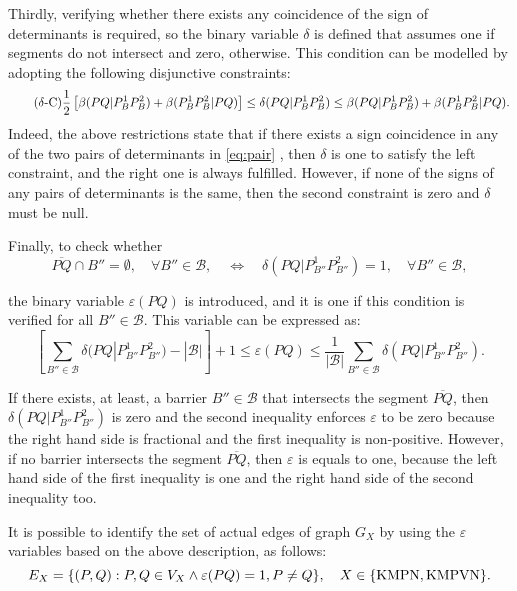 \documentclass[a4paper,  review, authoryear, 1p.]{elsarticle}
\newcommand{\B}{{\mathcal B}}
\newcommand{\segment}[2]{\overline{#1#2}}
\begin{document}
\bigskip

\newcommand{\deltacheck}[4]{\delta(#1#2|#3#4)}

Thirdly, verifying whether there exists any coincidence of the sign of determinants is required, so the binary variable $\delta$ is defined that assumes one if segments do not intersect and zero, otherwise. This condition can be modelled by adopting the following disjunctive constraints:
\begin{equation*}\tag{$\delta$-C}\label{eq:deltaC}
	\frac{1}{2}\left[\betamas{P}{Q}{P_B^1}{P_B^2}+\betamas{P_B^1}{P_B^2}{P}{Q}\right]\leq\deltacheck{P}{Q}{P_B^1}{P_B^2}\leq \betamas{P}{Q}{P_B^1}{P_B^2}+\betamas{P_B^1}{P_B^2}{P}{Q}.
\end{equation*}
Indeed, the above restrictions state that if there exists a sign coincidence in any of the two pairs of determinants in \eqref{eq:pair} , then $\delta$ is one to satisfy the left constraint, and the right one is always fulfilled. However, if none of the signs of any pairs of determinants is the same, then the second constraint is zero and $\delta$ must be null.

\newcommand{\varepsilonvar}[2]{\varepsilon(#1#2)}

Finally, to check whether
$$\overline{PQ}\cap B''=\emptyset,\quad \forall B''\in\B,\quad\Longleftrightarrow\quad \deltacheck{P}{Q}{P_{B''}^1}{P_{B''}^2}=1,\quad\forall B''\in\B,$$

the binary variable $\varepsilonvar{P}{Q}$ is introduced, and it is one if this condition is verified for all $B''\in\B$. This variable can be expressed as: 
\begin{equation*}\tag{$\varepsilon$-C}\label{eq:varepsilonC}
	\left[\sum_{B''\in\mathcal B}\deltacheck{P}{Q}{P^1_{B''}}{P^2_{B''}}-|\mathcal B|\right] + 1\leq \varepsilonvar{P}{Q}\leq \frac{1}{|\B|}\sum_{B''\in\mathcal B}\deltacheck{P}{Q}{P^1_{B''}}{P^2_{B''}}.
\end{equation*}

If there exists, at least, a barrier $B''\in\B$ that intersects the segment $\overline{PQ}$, then $\deltacheck{P}{Q}{P^1_{B''}}{P^2_{B''}}$ is zero and the second inequality enforces $\varepsilon$ to be zero because the right hand side is fractional and the first inequality is non-positive. However, if no barrier intersects the segment $\segment{P}{Q}$, then $\varepsilon$ is equals to one, because the left hand side of the first inequality is one and the right hand side of the second inequality too.

It is possible to identify the set of actual edges of graph $G_X$ by using the $\varepsilon$ variables based on the above description, as follows:
$$ E_X = \{(P, Q):P,Q\in V_X\wedge\varepsilonvar{P}{Q}=1, P\neq Q\}, \quad X\in \{\rm KMPN, \rm KMPVN\}.$$
\end{document}
